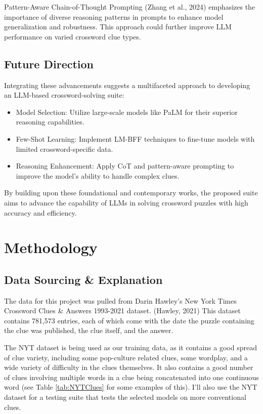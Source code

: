 \documentclass[
	a4paper, %
	10pt, %
	unnumberedsections, %
	twoside, %
]{LTJournalArticle}
\begin{document}
\noindent Pattern-Aware Chain-of-Thought Prompting (Zhang et al., 2024) emphasizes the importance of diverse reasoning patterns in prompts to enhance model generalization and robustness. This approach could further improve LLM performance on varied crossword clue types.

\subsection{Future Direction}

Integrating these advancements suggests a multifaceted approach to developing an LLM-based crossword-solving suite:
\begin{itemize}
	\item Model Selection: Utilize large-scale models like PaLM for their superior reasoning capabilities.
	
	\item Few-Shot Learning: Implement LM-BFF techniques to fine-tune models with limited crossword-specific data.
	
	
	\item Reasoning Enhancement: Apply CoT and pattern-aware prompting to improve the model's ability to handle complex clues.
\end{itemize}



By building upon these foundational and contemporary works, the proposed suite aims to advance the capability of LLMs in solving crossword puzzles with high accuracy and efficiency.




\section{Methodology}

\subsection{Data Sourcing \& Explanation}

The data for this project was pulled from Darin Hawley's New York Times Crossword Clues \& Answers 1993-2021 dataset. (Hawley, 2021) This dataset contains 781,573 entries, each of which come with the date the puzzle containing the clue was published, the clue itself, and the answer. 

The NYT dataset is being used as our training data, as it contains a good spread of clue variety, including some pop-culture related clues, some wordplay, and a wide variety of difficulty in the clues themselves. It also contains a good number of clues involving multiple words in a clue being concatenated into one continuous word (see Table \ref{tab:NYTClues} for some examples of this). I'll also use the NYT dataset for a testing suite that tests the selected models on more conventional clues.
\end{document}

